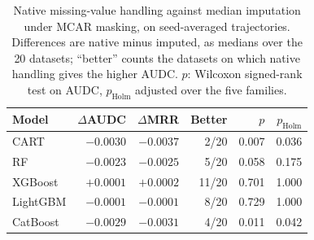 \documentclass[pdflatex,sn-mathphys]{sn-jnl}
\theoremstyle{thmstyleone}
\begin{document}
\begin{table}[t]
\centering
\small
\caption{Native missing-value handling against median imputation under MCAR masking, on seed-averaged trajectories. Differences are native minus imputed, as medians over the 20 datasets; ``better'' counts the datasets on which native handling gives the higher AUDC. $p$: Wilcoxon signed-rank test on AUDC, $p_{\mathrm{Holm}}$ adjusted over the five families.}
\label{tab:native}
\begin{tabular}{@{}lrrrrr@{}}
\toprule
Model & $\Delta$AUDC & $\Delta$MRR & Better & $p$ & $p_{\mathrm{Holm}}$ \\
\midrule
CART & $-0.0030$ & $-0.0037$ & 2/20 & 0.007 & 0.036 \\
RF & $-0.0023$ & $-0.0025$ & 5/20 & 0.058 & 0.175 \\
XGBoost & $+0.0001$ & $+0.0002$ & 11/20 & 0.701 & 1.000 \\
LightGBM & $-0.0001$ & $-0.0001$ & 8/20 & 0.729 & 1.000 \\
CatBoost & $-0.0029$ & $-0.0031$ & 4/20 & 0.011 & 0.042 \\
\bottomrule
\end{tabular}
\end{table}
\end{document}
